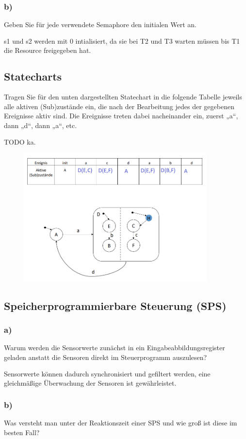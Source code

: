 \subsubsection{b)}
Geben Sie für jede verwendete Semaphore den initialen Wert an.

s1 und s2 werden mit 0 intialisiert, da sie bei T2 und T3 warten müssen bis T1 die Resource freigegeben hat.

\subsection{Statecharts}
Tragen Sie für den unten dargestellten Statechart in die folgende Tabelle jeweils alle aktiven (Sub)zustände
ein, die nach der Bearbeitung jedes der gegebenen Ereignisse aktiv sind. Die Ereignisse treten dabei
nacheinander ein, zuerst „a“, dann „d“, dann „a“, etc.

TODO ka.
\begin{figure}[H]
  \includegraphics[width=10cm]{images/KA020222/5a.PNG}
  \centering
\end{figure}

\subsection{Speicherprogrammierbare Steuerung (SPS)}
\subsubsection{a)}
Warum werden die Sensorwerte zunächst in ein Eingabeabbildungsregister geladen anstatt die
Sensoren direkt im Steuerprogramm auszulesen?

Sensorwerte können dadurch synchronisiert und gefiltert werden, eine gleichmäßige Überwachung der Sensoren ist gewährleistet.

\subsubsection{b)}
Was versteht man unter der Reaktionszeit einer SPS und wie groß ist diese im besten Fall?

